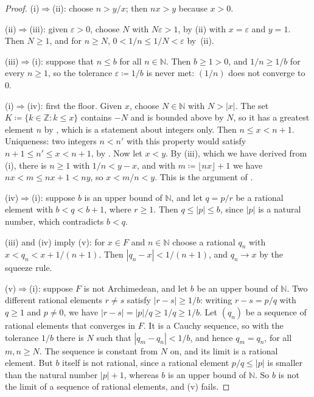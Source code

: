 \begin{proof}
(i)$\Rightarrow$(ii): choose $n>y/x$; then $nx>y$ because $x>0$.

(ii)$\Rightarrow$(iii): given $\varepsilon>0$, choose $N$ with $N\varepsilon>1$, by (ii) with $x=\varepsilon$ and $y=1$. Then $N\ge1$, and for $n\ge N$, $0<1/n\le1/N<\varepsilon$ by \,(ii).

(iii)$\Rightarrow$(i): suppose that $n\le b$ for all $n\in\mathbb N$. Then $b\ge1>0$, and $1/n\ge1/b$ for every $n\ge1$, so the tolerance $\varepsilon\coloneqq1/b$ is never met: $(1/n)$ does not converge to $0$.

(i)$\Rightarrow$(iv): first the floor. Given $x$, choose $N\in\mathbb N$ with $N>|x|$. The set $K\coloneqq\{k\in\mathbb Z: k\le x\}$ contains $-N$ and is bounded above by $N$, so it has a greatest element $n$ by , which is a statement about integers only. Then $n\le x<n+1$. Uniqueness: two integers $n<n'$ with this property would satisfy $n+1\le n'\le x<n+1$, by . Now let $x<y$. By (iii), which we have derived from (i), there is $n\ge1$ with $1/n<y-x$, and with $m\coloneqq\lfloor nx\rfloor+1$ we have $nx<m\le nx+1<ny$, so $x<m/n<y$. This is the argument of .

(iv)$\Rightarrow$(i): suppose $b$ is an upper bound of $\mathbb N$, and let $q=p/r$ be a rational element with $b<q<b+1$, where $r\ge1$. Then $q\le|p|\le b$, since $|p|$ is a natural number, which contradicts $b<q$.

(iii) and (iv) imply (v): for $x\in F$ and $n\in\mathbb N$ choose a rational $q_n$ with $x<q_n<x+1/(n+1)$. Then $|q_n-x|<1/(n+1)$, and $q_n\to x$ by the squeeze rule.

(v)$\Rightarrow$(i): suppose $F$ is not Archimedean, and let $b$ be an upper bound of $\mathbb N$. Two different rational elements $r\ne s$ satisfy $|r-s|\ge1/b$: writing $r-s=p/q$ with $q\ge1$ and $p\ne0$, we have $|r-s|=|p|/q\ge1/q\ge1/b$. Let $(q_n)$ be a sequence of rational elements that converges in $F$. It is a Cauchy sequence, so with the tolerance $1/b$ there is $N$ such that $|q_m-q_n|<1/b$, and hence $q_m=q_n$, for all $m,n\ge N$. The sequence is constant from $N$ on, and its limit is a rational element. But $b$ itself is not rational, since a rational element $p/q\le|p|$ is smaller than the natural number $|p|+1$, whereas $b$ is an upper bound of $\mathbb N$. So $b$ is not the limit of a sequence of rational elements, and (v) fails.
\end{proof}

